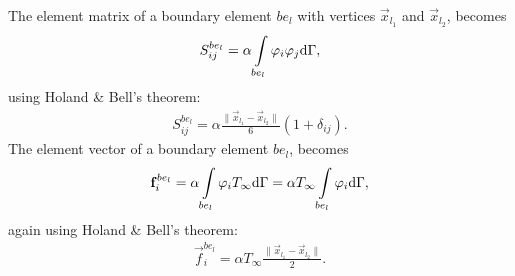The element matrix of a boundary element $be_l$ with vertices $\vec{x}_{l_1}$ and $\vec{x}_{l_2}$, becomes
\begin{gather*}
    S_{ij}^{be_l} = \alpha \int\displaylimits_{be_l}\varphi_i \varphi_j \mathrm{d}\Gamma,
\end{gather*} using Holand \& Bell's theorem:
\begin{gather}
    S_{ij}^{be_l} = \alpha \frac{\lVert \vec{x}_{l_1} - \vec{x}_{l_2} \rVert}{6} \left( 1 + \delta_{ij} \right).
\end{gather}
The element vector of a boundary element $be_l$, becomes
\begin{gather*}
    \vec{f}_i^{be_l} = \alpha \int\displaylimits_{be_l}\varphi_i T_{\infty} \mathrm{d}\Gamma = \alpha T_{\infty} \int\displaylimits_{be_l}\varphi_i \mathrm{d}\Gamma,
\end{gather*} again using Holand \& Bell's theorem:
\begin{gather}
    \vec{f}_i^{be_l} = \alpha T_{\infty} \frac{\lVert \vec{x}_{l_1} - \vec{x}_{l_2} \rVert}{2}.
    \label{eq:boundary_vector}
\end{gather}